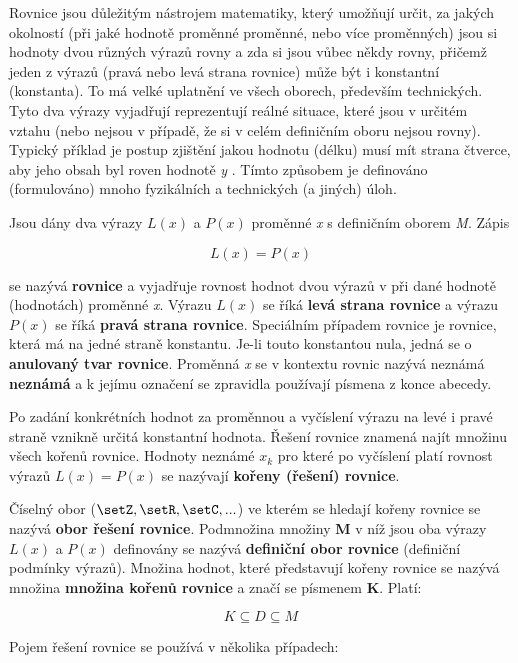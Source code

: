 

Rovnice jsou důležitým nástrojem matematiky, který umožňují určit, za jakých okolností (při jaké hodnotě proměnné proměnné, nebo více proměnných) jsou si hodnoty dvou různých výrazů rovny a zda si jsou vůbec někdy rovny, přičemž jeden z výrazů (pravá nebo levá strana rovnice) může být i konstantní (konstanta). To má velké uplatnění ve všech oborech, především technických. Tyto dva výrazy vyjadřují reprezentují reálné situace, které jsou v určitém vztahu (nebo nejsou v případě, že si v celém definičním oboru nejsou rovny). Typický příklad je postup zjištění jakou hodnotu (délku) musí mít strana čtverce, aby jeho obsah byl roven hodnotě {\it y} . Tímto způsobem je definováno (formulováno) mnoho fyzikálních a technických (a jiných) úloh. 

Jsou dány dva výrazy $L(x)$ a $P(x)$ proměnné {\it x} s definičním oborem {\it M}. Zápis 

$$ L(x) = P(x) $$

se nazývá {\bf rovnice} a vyjadřuje rovnost hodnot dvou výrazů v při dané hodnotě (hodnotách) proměnné {\it x}. Výrazu $L(x)$ se říká {\bf levá strana rovnice} a výrazu $P(x)$ se říká {\bf pravá strana rovnice}. Speciálním případem rovnice je rovnice, která má na jedné straně konstantu. Je-li touto konstantou nula, jedná se o {\bf anulovaný tvar rovnice}. Proměnná {\it x} se v kontextu rovnic nazývá neznámá {\bf neznámá} a k jejímu označení se zpravidla používají písmena z konce abecedy.

Po zadání konkrétních hodnot za proměnnou a vyčíslení výrazu na levé i pravé straně vznikně určitá konstantní hodnota. Řešení rovnice znamená najít množinu všech kořenů rovnice. Hodnoty neznámé $x_k$ pro které po vyčíslení platí rovnost výrazů $L(x) = P(x)$ se nazývají {\bf kořeny (řešení) rovnice}.

Číselný obor ($\setZ,\setR,\setC, ...$) ve kterém se hledají kořeny rovnice se nazývá {\bf obor řešení rovnice}. Podmnožina množiny {\bf M} v níž jsou oba výrazy $L(x)$ a $P(x)$ definovány se nazývá {\bf definiční obor rovnice} (definiční podmínky výrazů). Množina hodnot, které představují kořeny rovnice se nazývá množina {\bf množina kořenů rovnice} a značí se písmenem {\bf K}. Platí:

$$ K \subseteq D \subseteq M $$

Pojem řešení rovnice se používá v několika případech:

\vskip 4mm
\vskip 4mm

